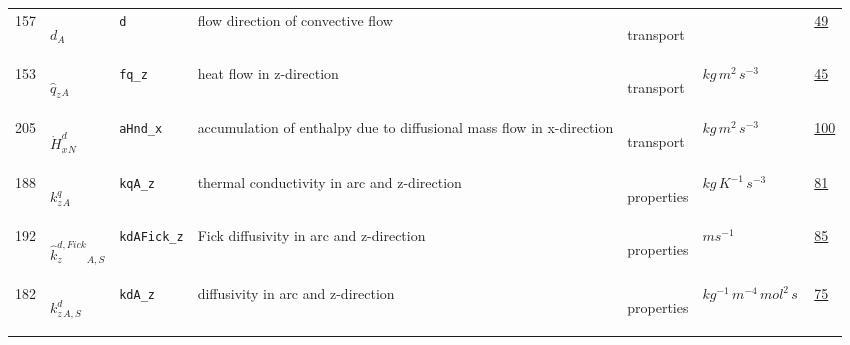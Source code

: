 \begin{longtable}{|p{1cm}|p{2.5cm}|p{4.5cm}|p{8cm}|p{3.0cm}|p{3cm}|p{1cm}|}
            157
             & \hypertarget{"v:157"}{ $ {d}{_{A}} $}
             & \verb|d|
             & flow direction of convective flow
             & \begin{lay}transport \end{lay}
             & $  $
             &                 \hyperlink{"e:49"}{ 49 }
                 \\
            153
             & \hypertarget{"v:153"}{ $ {{\hat{q}_z}}{_{A}} $}
             & \verb|fq_z|
             & heat flow in z-direction
             & \begin{lay}transport \end{lay}
             & $ kg \,m^{2} \,s^{-3} \, $
             &                 \hyperlink{"e:45"}{ 45 }
                 \\
            205
             & \hypertarget{"v:205"}{ $ {{\dot{H}^d_x}}{_{N}} $}
             & \verb|aHnd_x|
             & accumulation of enthalpy due to diffusional mass flow in x-direction
             & \begin{lay}transport \end{lay}
             & $ kg \,m^{2} \,s^{-3} \, $
             &                 \hyperlink{"e:100"}{ 100 }
                 \\
            188
             & \hypertarget{"v:188"}{ $ {{k^q_z}}{_{A}} $}
             & \verb|kqA_z|
             & thermal conductivity in arc and z-direction
             & \begin{lay}properties \end{lay}
             & $ kg \,K^{-1} \,s^{-3} \, $
             &                 \hyperlink{"e:81"}{ 81 }
                 \\
            192
             & \hypertarget{"v:192"}{ $ {{\hat{k}^{d,Fick}_z}}{_{A, S}} $}
             & \verb|kdAFick_z|
             & Fick diffusivity in arc and z-direction
             & \begin{lay}properties \end{lay}
             & $ m s^{-1} \, $
             &                 \hyperlink{"e:85"}{ 85 }
                 \\
            182
             & \hypertarget{"v:182"}{ $ {{k^d_z}}{_{A, S}} $}
             & \verb|kdA_z|
             & diffusivity in arc and z-direction
             & \begin{lay}properties \end{lay}
             & $ kg^{-1} \,m^{-4} \,mol^{2} \,s \, $
             &                 \hyperlink{"e:75"}{ 75 }

\end{longtable}
